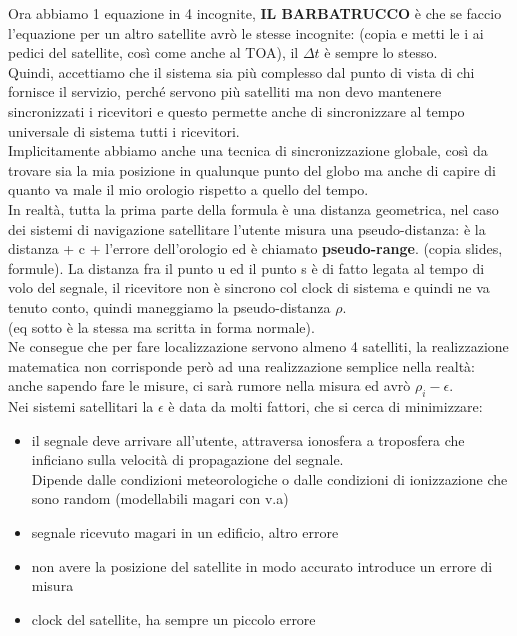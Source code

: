 \documentclass[oneside, 12pt]{extbook}
\begin{document}
Ora abbiamo 1 equazione in 4 incognite, \textbf{IL BARBATRUCCO} è che se faccio l'equazione per un altro satellite avrò le stesse incognite:
(copia e metti le i ai pedici del satellite, così come anche al TOA), il $\Delta t$ è sempre lo stesso.\\
Quindi, accettiamo che il sistema sia più complesso dal punto di vista di chi fornisce il servizio, perché servono più satelliti ma non devo mantenere sincronizzati i ricevitori e questo permette anche di sincronizzare al tempo universale di sistema tutti i ricevitori.\\
Implicitamente abbiamo anche una tecnica di sincronizzazione globale, così da trovare sia la mia posizione in qualunque punto del globo ma anche di capire di quanto va male il mio orologio rispetto a quello del tempo.\\
In realtà, tutta la prima parte della formula è una distanza geometrica, nel caso dei sistemi di navigazione satellitare l'utente misura una pseudo-distanza: è la distanza + c + l'errore dell'orologio ed è chiamato \textbf{pseudo-range}. (copia slides, formule).
La distanza fra il punto u ed il punto s è di fatto legata al tempo di volo del segnale, il ricevitore non è sincrono col clock di sistema e quindi ne va tenuto conto, quindi maneggiamo la pseudo-distanza $\rho$.\\
(eq sotto è la stessa ma scritta in forma normale).\\
Ne consegue che per fare localizzazione servono almeno 4 satelliti, la realizzazione matematica non corrisponde però ad una realizzazione semplice nella realtà: anche sapendo fare le misure, ci sarà rumore nella misura ed avrò $\rho_i - \epsilon$.\\
Nei sistemi satellitari la $\epsilon$ è data da molti fattori, che si cerca di minimizzare:
\begin{itemize}
	\item il segnale deve arrivare all'utente, attraversa ionosfera a troposfera che inficiano sulla velocità di propagazione del segnale.\\
	Dipende dalle condizioni meteorologiche o dalle condizioni di ionizzazione che sono random (modellabili magari con v.a)
	\item segnale ricevuto magari in un edificio, altro errore
	\item non avere la posizione del satellite in modo accurato introduce un errore di misura
	\item clock del satellite, ha sempre un piccolo errore
\end{itemize}
\end{document}
